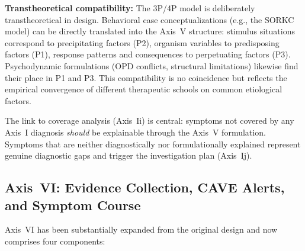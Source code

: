\documentclass[11pt,a4paper]{article}
\begin{document}
\textbf{Transtheoretical compatibility:} The 3P/4P model is deliberately transtheoretical in design. Behavioral case conceptualizations (e.g., the SORKC model) can be directly translated into the Axis~V structure: stimulus situations correspond to precipitating factors (P2), organism variables to predisposing factors (P1), response patterns and consequences to perpetuating factors (P3). Psychodynamic formulations (OPD conflicts, structural limitations) likewise find their place in P1 and P3. This compatibility is no coincidence but reflects the empirical convergence of different therapeutic schools on common etiological factors.

The link to coverage analysis (Axis~Ii) is central: symptoms not covered by any Axis~I diagnosis \textit{should} be explainable through the Axis~V formulation. Symptoms that are neither diagnostically nor formulationally explained represent genuine diagnostic gaps and trigger the investigation plan (Axis~Ij).

\subsection{Axis~VI: Evidence Collection, CAVE Alerts, and Symptom Course}

Axis~VI has been substantially expanded from the original design and now comprises four components:
\end{document}
